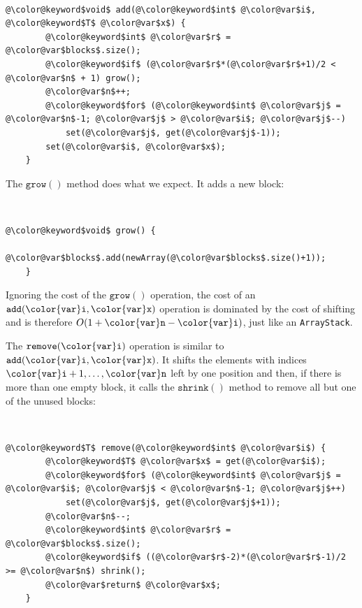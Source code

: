 \documentclass[10pt]{book}
\theoremstyle{plain}
\theoremstyle{definition}
\begin{document}
 \ \vspace{.5ex}\begin{Verbatim}[gobble=1,tabsize=2,frame=single,framerule=1.2pt,commandchars=\\@\$,label=\texttt{RootishArrayStack},labelposition=topline]
	@\color@keyword$void$ add(@\color@keyword$int$ @\color@var$i$, @\color@keyword$T$ @\color@var$x$) {
		@\color@keyword$int$ @\color@var$r$ = @\color@var$blocks$.size();
		@\color@keyword$if$ (@\color@var$r$*(@\color@var$r$+1)/2 < @\color@var$n$ + 1) grow();
		@\color@var$n$++;
		@\color@keyword$for$ (@\color@keyword$int$ @\color@var$j$ = @\color@var$n$-1; @\color@var$j$ > @\color@var$i$; @\color@var$j$--)
			set(@\color@var$j$, get(@\color@var$j$-1));
		set(@\color@var$i$, @\color@var$x$);
	}
\end{Verbatim}


The \ensuremath{\mathtt{grow()}} method does what we expect. It adds a new block:



 \ \vspace{.5ex}\begin{Verbatim}[gobble=1,tabsize=2,frame=single,framerule=1.2pt,commandchars=\\@\$,label=\texttt{RootishArrayStack},labelposition=topline]
	@\color@keyword$void$ grow() {
		@\color@var$blocks$.add(newArray(@\color@var$blocks$.size()+1));
	}
\end{Verbatim}


Ignoring the cost of the \ensuremath{\mathtt{grow()}} operation, the cost of an \ensuremath{\mathtt{add({\color{var}i},{\color{var}x})}}
operation is dominated by the cost of shifting and is therefore
$O(1+\ensuremath{\mathtt{{\color{var}n}}}-\ensuremath{\mathtt{{\color{var}i}}})$, just like an \texttt{ArrayStack}.

The \ensuremath{\mathtt{remove({\color{var}i})}} operation is similar to \ensuremath{\mathtt{add({\color{var}i},{\color{var}x})}}.  It shifts the
elements with indices $\ensuremath{\mathtt{{\color{var}i}}}+1,\ldots,\ensuremath{\mathtt{{\color{var}n}}}$ left by one position and then,
if there is more than one empty block, it calls the \ensuremath{\mathtt{shrink()}} method
to remove all but one of the unused blocks:



 \ \vspace{.5ex}\begin{Verbatim}[gobble=1,tabsize=2,frame=single,framerule=1.2pt,commandchars=\\@\$,label=\texttt{RootishArrayStack},labelposition=topline]
	@\color@keyword$T$ remove(@\color@keyword$int$ @\color@var$i$) {
		@\color@keyword$T$ @\color@var$x$ = get(@\color@var$i$);
		@\color@keyword$for$ (@\color@keyword$int$ @\color@var$j$ = @\color@var$i$; @\color@var$j$ < @\color@var$n$-1; @\color@var$j$++)
			set(@\color@var$j$, get(@\color@var$j$+1));
		@\color@var$n$--;
		@\color@keyword$int$ @\color@var$r$ = @\color@var$blocks$.size();
		@\color@keyword$if$ ((@\color@var$r$-2)*(@\color@var$r$-1)/2 >= @\color@var$n$)	shrink();
		@\color@var$return$ @\color@var$x$;
	}
\end{Verbatim}
\end{document}
